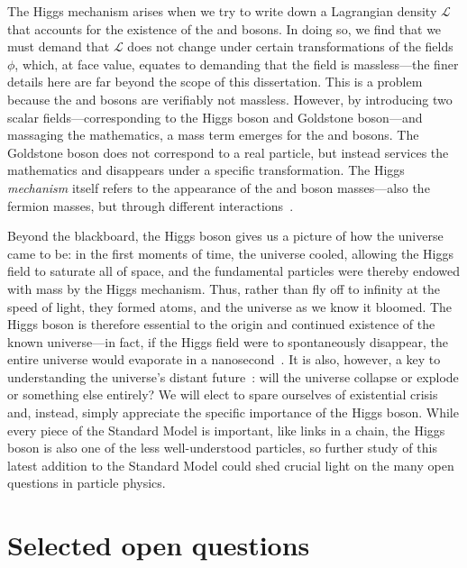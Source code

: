 The Higgs mechanism arises when we try to write down a Lagrangian density $\mathcal{L}$ that accounts for the existence of the \PW and \PZ bosons. 
In doing so, we find that we must demand that $\mathcal{L}$ does not change under certain transformations of the fields $\phi$, which, at face value, equates to demanding that the field is massless---the finer details here are far beyond the scope of this dissertation. 
This is a problem because the \PW and \PZ bosons are verifiably not massless. 
However, by introducing two scalar fields---corresponding to the Higgs boson and Goldstone boson---and massaging the mathematics, a mass term emerges for the \PW and \PZ bosons. 
The Goldstone boson does not correspond to a real particle, but instead services the mathematics\footnotemark{} and disappears under a specific transformation. 
The Higgs \textit{mechanism} itself refers to the appearance of the \PW and \PZ boson masses---also the fermion masses, but through different interactions~\cite{Weinberg:1967tq, Nambu:1961fr}. 

Beyond the blackboard, the Higgs boson gives us a picture of how the universe came to be: in the first moments of time, the universe cooled, allowing the Higgs field to saturate all of space, and the fundamental particles were thereby endowed with mass by the Higgs mechanism. 
Thus, rather than fly off to infinity at the speed of light, they formed atoms, and the universe as we know it bloomed.  
The Higgs boson is therefore essential to the origin and continued existence of the known universe---in fact, if the Higgs field were to spontaneously disappear, the entire universe would evaporate in a nanosecond~\cite{P5Report}. 
It is also, however, a key to understanding the universe's distant future~\cite{Bass2021}: will the universe collapse or explode or something else entirely? 
We will elect to spare ourselves of existential crisis and, instead, simply appreciate the specific importance of the Higgs boson. 
While every piece of the Standard Model is important, like links in a chain, the Higgs boson is also one of the less well-understood particles, so further study of this latest addition to the Standard Model could shed crucial light on the many open questions in particle physics. 

\section{Selected open questions}\label{sec:open_questions}
